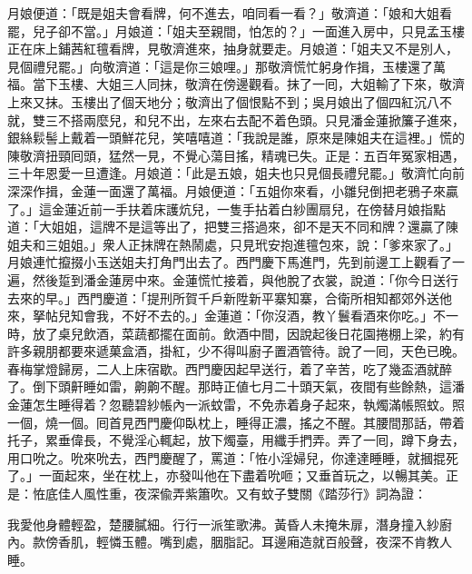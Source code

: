 月娘便道：「既是姐夫會看牌，何不進去，咱同看一看？」{}敬濟道：「娘和大姐看罷，兒子卻不當。」{}月娘道：「姐夫至親間，怕怎的？」一面進入房中，只見孟玉樓正在床上鋪茜紅氊看牌，見敬濟進來，抽身就要走。月娘道：「姐夫又不是別人，見個禮兒罷。」{}向敬濟道：「這是你三娘哩。」那敬濟慌忙躬身作揖，玉樓還了萬福。當下玉樓、大姐三人同抹，敬濟在傍邊觀看。抹了一囘，大姐輸了下來，敬濟上來又抹。玉樓出了個天地分；敬濟出了個恨點不到；吳月娘出了個四紅沉八不就，雙三不搭兩麼兒，和兒不出，左來右去配不着色頭。只見潘金蓮掀簾子進來，銀絲鬏髻上戴着一頭鮮花兒，{}笑嘻嘻道：「我說是誰，原來是陳姐夫在這裡。」{}慌的陳敬濟扭頸囘頭，猛然一見，不覺心蕩目搖，精魂已失。正是：五百年冤家相遇，三十年恩愛一旦遭逢。月娘道：「此是五娘，姐夫也只見個長禮兒罷。」敬濟忙向前深深作揖，金蓮一面還了萬福。月娘便道：「五姐你來看，小雛兒倒把老鴉子來贏了。」這金蓮近前一手扶着床護炕兒，一隻手拈着白紗團扇兒，在傍替月娘指點道：「大姐姐，這牌不是這等出了，把雙三搭過來，卻不是天不同和牌？還贏了陳姐夫和三姐姐。」衆人正抹牌在熱鬧處，只見玳安抱進氊包來，說：「爹來家了。」月娘連忙攛掇小玉送姐夫打角門出去了。{}西門慶下馬進門，先到前邊工上觀看了一遍，然後踅到潘金蓮房中來。金蓮慌忙接着，與他脫了衣裳，說道：「你今日送行去來的早。」西門慶道：「提刑所賀千戶新陞新平寨知寨，合衛所相知都郊外送他來，拏帖兒知會我，不好不去的。」金蓮道：「你沒酒，教丫鬟看酒來你吃。」不一時，放了桌兒飲酒，菜蔬都擺在面前。飲酒中間，因說起後日花園捲棚上梁，約有許多親朋都要來遞菓盒酒，掛紅，少不得叫廚子置酒管待。說了一囘，天色已晚。春梅掌燈歸房，二人上床宿歇。西門慶因起早送行，着了辛苦，吃了幾盃酒就醉了。倒下頭鼾睡如雷，齁齁不醒。那時正値七月二十頭天氣，夜間有些餘熱，這潘金蓮怎生睡得着？忽聽碧紗帳內一派蚊雷，不免赤着身子起來，執燭滿帳照蚊。照一個，燒一個。囘首見西門慶仰臥枕上，睡得正濃，搖之不醒。其腰間那話，帶着托子，累垂偉長，不覺淫心輒起，放下燭臺，用纖手捫弄。{}弄了一囘，蹲下身去，用口吮之。吮來吮去，西門慶醒了，罵道：「恠小淫婦兒，你達達睡睡，就摑掍死了。」一面起來，坐在枕上，亦發叫他在下盡着吮咂；又垂首玩之，以暢其美。正是：恠底佳人風性重，夜深偸弄紫簫吹。又有蚊子雙關《踏莎行》詞為證：

\begin{myquote}
我愛他身體輕盈，楚腰膩細。行行一派笙歌沸。黃昏人未掩朱扉，潛身撞入紗廚內。款傍香肌，輕憐玉體。嘴到處，胭脂記。耳邊廂造就百般聲，夜深不肯教人睡。
\end{myquote}

